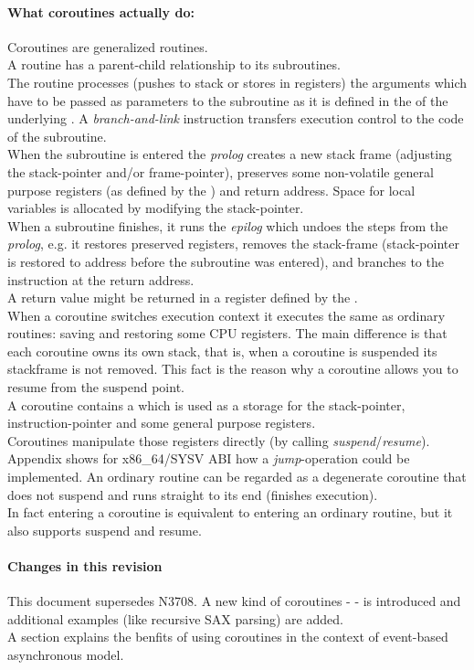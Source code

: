 \paragraph*{What coroutines actually do:}
Coroutines are generalized routines.\\
\newline
A routine has a parent-child relationship to its subroutines.\\
The routine processes (pushes to stack or stores in registers) the arguments which
have to be passed as parameters to the subroutine as it is defined in the \cv
of the underlying \ABI. A \textit{branch-and-link} instruction transfers
execution control to the code of the subroutine.\\
When the subroutine is entered the \textit{prolog} creates a new stack frame
(adjusting the stack-pointer and/or frame-pointer), preserves some
non-volatile general purpose registers (as defined by the \cv) and return
address. Space for local variables is allocated by modifying the
stack-pointer.\\
When a subroutine  finishes, it runs the \textit{epilog} which undoes the steps
from the \textit{prolog}, e.g. it restores preserved registers, removes the
stack-frame (stack-pointer is restored to address before the subroutine was entered),
and branches to the instruction at the return address.\\
A return value might be returned in a register defined by the \cv.\\
\newline
When a coroutine switches execution context it executes the same as
ordinary routines: saving and restoring some CPU registers. The main
difference is that each coroutine owns its own stack, that is, when a coroutine is
suspended its stackframe is not removed. This fact is the reason why a coroutine
allows you to resume from the suspend point.\\ A coroutine contains a
\cblock which is used as a storage for the stack-pointer, instruction-pointer and
some general purpose registers.\\ Coroutines manipulate those registers directly
(by calling \textit{suspend}/\textit{resume}).\\
Appendix  shows for x86\_64/SYSV ABI how a
\textit{jump}-operation could be implemented.
\newline
An ordinary routine can be regarded as a degenerate coroutine that
does not suspend and runs straight to its end (finishes execution).\\
\newline
In fact entering a coroutine is equivalent to entering an ordinary routine, but
it also supports suspend and resume.

\paragraph*{Changes in this revision}
This document supersedes N3708. A new kind of coroutines - \scoro - is introduced
and additional examples (like recursive SAX parsing) are added.\\
A section explains the benfits of using coroutines in the context of event-based
asynchronous model.
